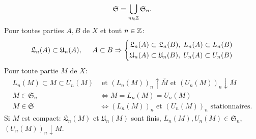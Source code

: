 \begin{propn}\label{Prop:PromApprox}
\begin{displaymath}
 \mathfrak{S} = \bigcup_{n \in \mathbb{Z}} \mathfrak{S}_n.
\end{displaymath}
Pour toutes parties $A, B$ de $X$ et tout $n\in \mathbb{Z}$:
\begin{displaymath}
 \mathfrak{L}_n(A) \subset \mathfrak{U}_n(A), \hspace{0.5cm} A\subset B \Rightarrow
   \left\lbrace
     \begin{aligned}
        \mathfrak{L}_n(A) &\subset \mathfrak{L}_n(B), \; L_n(A) \subset L_n(B) \\
        \mathfrak{U}_n(A) &\subset \mathfrak{U}_n(B), \; U_n(A) \subset U_n(B)
     \end{aligned}
  \right.
\end{displaymath}
Pour toute partie $M$ de $X$:
 \begin{align*}
    L_n(M) \subset M \subset U_n(M) &\text{ et } (L_n(M))_n \uparrow \overset{\circ}{M} \text{ et } (U_n(M))_n \downarrow \overline{M}\\
    M\in \mathfrak{S}_n &\Leftrightarrow M = L_n(M) = U_n(M) \\
    M\in \mathfrak{S} &\Leftrightarrow (L_n(M))_n \text{ et } (U_n(M))_n \text{ stationnaires}.
 \end{align*}
Si $M$ est compact: $\mathfrak{L}_n(M)$ et $\mathfrak{U}_n(M)$ sont finis, $L_n(M), U_n(M) \in \mathfrak{S}_n$, $(U_n(M))_n \downarrow M$.
\end{propn}
